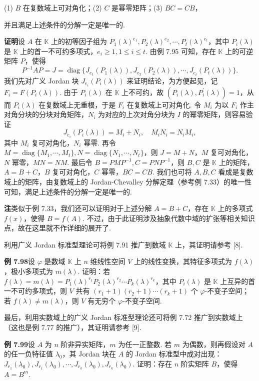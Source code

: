 \documentclass[UTF8, 12pt, fontset=fandol, oneside]{ctexart}
\begin{document}
(1) $B$ 在复数域上可对角化；\quad (2) $C$ 是幂零矩阵；\quad (3) $BC=CB$，

并且满足上述条件的分解一定是唯一的.

\noindent\textbf{证明}\quad 设 $A$ 在 $\mathbb{K}$ 上的初等因子组为 $P_1(\lambda)^{e_1},P_2(\lambda)^{e_2},\cdots,P_t(\lambda)^{e_t}$，其中 $P_i(\lambda)$ 是 $\mathbb{K}$ 上的首一不可约多项式，$e_i\ge1,1\le i\le t$. 由例 7.95 可知，存在 $\mathbb{K}$ 上的可逆矩阵 $P$，使得
\[
P^{-1}AP=J=\operatorname{diag}\{J_{e_1}(P_1(\lambda)),J_{e_2}(P_2(\lambda)),\cdots,J_{e_t}(P_t(\lambda))\}.
\]
我们先对广义 Jordan 块 $J_{e_i}(P_i(\lambda))$ 来证明结论，为方便起见，记 $F_i=F(P_i(\lambda))$. 由于 $P_i(\lambda)$ 在 $\mathbb{K}$ 上不可约，故 $(P_i(\lambda),P_i^{\prime}(\lambda))=1$，从而 $P_i(\lambda)$ 在复数域上无重根，于是 $F_i$ 在复数域上可对角化. 令 $M_i$ 为以 $F_i$ 作主对角分块的分块对角矩阵，$N_i$ 为对应的上次对角分块为 $I$ 的幂零矩阵，则容易验证
\[
J_{e_i}(P_i(\lambda))=M_i+N_i,\quad M_iN_i=N_iM_i,
\]
其中 $M_i$ 复可对角化，$N_i$ 幂零. 再令 $M=\operatorname{diag}\{M_1,\cdots,M_t\},N=\operatorname{diag}\{N_1,\cdots,N_t\}$，则 $J=M+N$，$M$ 复可对角化，$N$ 幂零，$MN=NM$. 最后令 $B=PMP^{-1},C=PNP^{-1}$，则 $B,C$ 是 $\mathbb{K}$ 上的矩阵，$A=B+C$，$B$ 复可对角化，$C$ 幂零，$BC=CB$. 我们也可将 $A,B,C$ 看成是复数域上的矩阵，由复数域上的 Jordan-Chevalley 分解定理（参考例 7.33）的唯一性可知，满足上述条件的分解一定是唯一的.

\noindent\textbf{注}\quad 类似于例 7.33，我们还可以证明对于上述分解 $A=B+C$，存在 $\mathbb{K}$ 上的多项式 $f(x)$，使得 $B=f(A)$. 不过，由于此证明涉及抽象代数中域的扩张等相关知识点，故在这里就不作详细的展开了.

利用广义 Jordan 标准型理论可将例 7.91 推广到数域 $\mathbb{K}$ 上，其证明请参考 [8].

\noindent\textbf{例 7.98}\quad 设 $\varphi$ 是数域 $\mathbb{K}$ 上 $n$ 维线性空间 $V$ 上的线性变换，其特征多项式为 $f(\lambda)$，极小多项式为 $m(\lambda)$. 证明：若 $f(\lambda)=m(\lambda)=P_1(\lambda)^{r_1}P_2(\lambda)^{r_2}\cdots P_k(\lambda)^{r_k}$，其中 $P_i(\lambda)$ 是 $\mathbb{K}$ 上互异的首一不可约多项式，则 $V$ 共有 $(r_1+1)(r_2+1)\cdots(r_k+1)$ 个 $\varphi$-不变子空间；若 $f(\lambda)\ne m(\lambda)$，则 $V$ 有无穷个 $\varphi$-不变子空间.

最后，利用实数域上的广义 Jordan 标准型理论还可将例 7.72 推广到实数域上（这也是例 7.77 的推广），其证明请参考 [9].

\noindent\textbf{例 7.99}\quad 设 $A$ 为 $n$ 阶非异实矩阵，$m$ 为任一正整数. 若 $m$ 为偶数，则再假设对 $A$ 的任一负特征值 $\lambda_0$，其 Jordan 块在 $A$ 的 Jordan 标准型中成对出现：$J_{r_1}(\lambda_0),J_{r_1}(\lambda_0),\cdots,J_{r_k}(\lambda_0),J_{r_k}(\lambda_0)$. 证明：存在 $n$ 阶实矩阵 $B$，使得 $A=B^m$.
\end{document}
